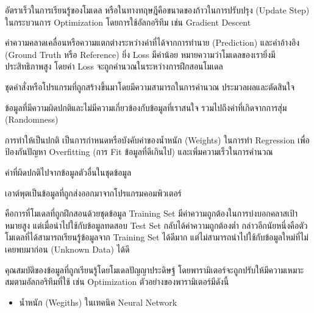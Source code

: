 \begin{description}[style=nextline]
    \item[Learning Rate] อัตราเร็วในการเรียนรู้ของโมเดล หรือในทางทฤษฎีคือขนาดของก้าวในการปรับปรุง (Update Step) ในกระบวนการ 
    Optimization โดยการใช้อัลกอริทึม เช่น Gradient Descent

    \item[Loss] ค่าความคลาดเคลื่อนหรือความแตกต่างระหว่างค่าที่ได้จากการทำนาย (Prediction) และค่าอ้างอิง (Ground Truth หรือ 
    Reference) ยิ่ง Loss มีค่าน้อย หมายความว่าโมเดลของเรายิ่งมีประสิทธิภาพสูง โดยค่า Loss จะถูกคำนวณในระหว่างการฝึกสอนโมเดล

    \item[Model] ชุดคำสั่งหรือโปรแกรมที่ถูกสร้างขึ้นมาโดยมีความสามารถในการคำนวณ ประมวลผลและตัดสินใจ

    \item[Noise] ข้อมูลที่มีความผิดปกติและไม่มีความเกี่ยวข้องกับข้อมูลที่เราสนใจ รวมไปถึงค่าที่เกิดจากการสุ่ม (Randomness)

    \item[Normalization] การทำให้เป็นปกติ เป็นการกำหนดหรือบังคับค่าของน้ำหนัก (Weights) ในการทำ Regression เพื่อป้องกันปัญหา
    Overfitting (การ Fit ข้อมูลที่ดีเกินไป) และเพิ่มความเร็วในการคำนวณ

    \item[Outlier] ค่าที่ผิดปกติไปจากข้อมูลตัวอื่นในชุดข้อมูล

    \item[Output] เอาต์พุตเป็นข้อมูลที่ถูกส่งออกมาจากโปรแกรมคอมพิวเตอร์

    \item[Overfitting] คือการที่โมเดลที่ถูกฝึกสอนด้วยชุดข้อมูล Training Set มีค่าความถูกต้องในการบ่งบอกคลาสเป้าหมายสูง 
    แต่เมื่อนำไปใช้กับข้อมูลทดสอบ Test Set กลับได้ค่าความถูกต้องต่ำ กล่าวอีกนัยหนึ่งคือตัวโมเดลที่ได้สามารถเรียนรู้ข้อมูลจาก Training Set 
    ได้ดีมาก แต่ไม่สามารถนำไปใช้กับข้อมูลใหม่ที่ไม่เคยพบมาก่อน (Unknown Data) ได้ดี

    \item[Parameter] คุณสมบัติของข้อมูลที่ถูกเรียนรู้โดยโมเดลปัญญาประดิษฐ์ โดยพารามิเตอร์จะถูกปรับให้มีความเหมาะสมตามอัลกอริทึมที่ใช้
    เช่น Optimization ตัวอย่างของพารามิเตอร์มีดังนี้
    \begin{itemize}
        \item น้ำหนัก (Wegiths) ในเทคนิค Neural Network
        

\end{itemize}
\end{description}
